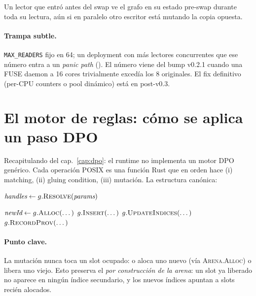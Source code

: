 \begin{invariante}
\label{inv:rcu-consistency}
Un lector que entró antes del swap ve el grafo en su estado pre-swap
durante toda su lectura, aún si en paralelo otro escritor está mutando
la copia opuesta.
\end{invariante}

\paragraph{Trampa subtle.} \texttt{MAX\_READERS} fijo en 64; un
deployment con más lectores concurrentes que ese número entra a un
\emph{panic path} (). El número
viene del bump v0.2.1 cuando una FUSE daemon a 16 cores trivialmente
excedía los 8 originales. El fix definitivo (per-CPU counters o pool
dinámico) está en post-v0.3.

\section{El motor de reglas: cómo se aplica un paso DPO}

Recapitulando del cap.~\ref{cap:dpo}: el runtime no implementa un motor
DPO genérico. Cada operación POSIX es una función Rust que en orden
hace (i) matching, (ii) gluing condition, (iii) mutación. La estructura
canónica:

\begin{algorithm}[H]
\SetAlgoLined
{}
\caption{\textsc{Esqueleto de cada op DPO en sotfs-ops}}\label{alg:op-skeleton}


$\textit{handles} \gets g.\textsc{Resolve}(\textit{params})$\;




$\textit{newId} \gets g.\textsc{Alloc}(\dots)$\;
$g.\textsc{Insert}(\dots)$\;
$g.\textsc{UpdateIndices}(\dots)$\;
$g.\textsc{RecordProv}(\dots)$
\;
\end{algorithm}

\paragraph{Punto clave.} La mutación nunca toca un slot ocupado: o
aloca uno nuevo (vía \textsc{Arena.Alloc}) o libera uno viejo. Esto
preserva el  \emph{por construcción de la
arena}: un slot ya liberado no aparece en ningún índice secundario, y
los nuevos índices apuntan a slots recién alocados.

